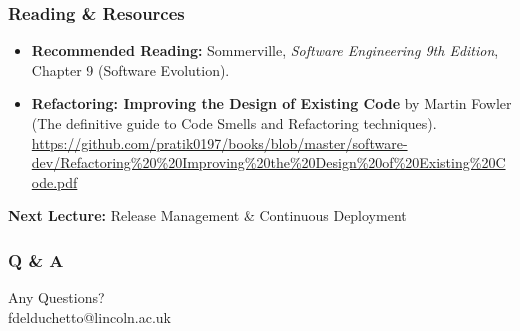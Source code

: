 \documentclass[xcolor=table]{beamer}
\begin{document}
\begin{frame}
    \frametitle{Reading \& Resources}
    \begin{itemize}
        \item \textbf{Recommended Reading:} 
        Sommerville, \textit{Software Engineering 9th Edition}, Chapter 9 (Software Evolution).
        \item \textbf{Refactoring: Improving the Design of Existing Code} by Martin Fowler (The definitive guide to Code Smells and Refactoring techniques). \url{https://github.com/pratik0197/books/blob/master/software-dev/Refactoring\%20\%20Improving\%20the\%20Design\%20of\%20Existing\%20Code.pdf}
    \end{itemize}
\end{frame}

\begin{frame}
    \begin{center}
        \textbf{Next Lecture:} Release Management \& Continuous Deployment 
    \end{center}
\end{frame}

\begin{frame}
    \frametitle{Q \& A}
    \begin{center}
        \Huge Any Questions?\\\vspace{0.5cm} 
        \normalsize fdelduchetto@lincoln.ac.uk
    \end{center}
\end{frame}
\end{document}
